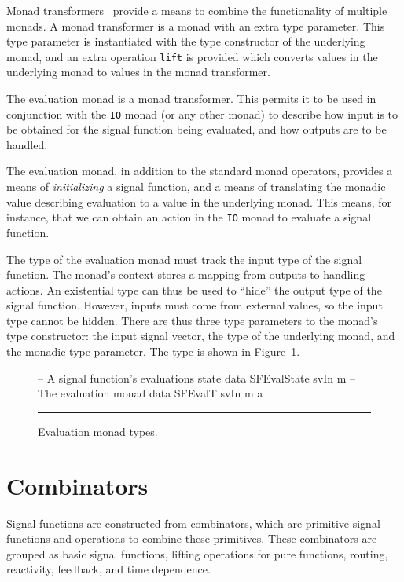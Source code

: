 Monad transformers~\cite{Jones1995} provide a means to combine the functionality
of multiple monads. A monad transformer is a monad with an extra type parameter.
This type parameter is instantiated with the type constructor of the underlying
monad, and an extra operation {\tt lift} is provided which converts values in
the underlying monad to values in the monad transformer.

The evaluation monad is a monad transformer. This permits it to be used in
conjunction with the {\tt IO} monad (or any other monad) to describe how input
is to be obtained for the signal function being evaluated, and how outputs are
to be handled.

The evaluation monad, in addition to the standard monad operators, provides a
means of {\em initializing} a signal function, and a means of translating the
monadic value describing evaluation to a value in the underlying monad. This
means, for instance, that we can obtain an action in the {\tt IO} monad to
evaluate a signal function.

The type of the evaluation monad must track the input type of the signal
function. The monad's context stores a mapping from outputs to handling actions.
An existential type can thus be used to ``hide'' the output type of the signal
function. However, inputs must come from external values, so the input type
cannot be hidden. There are thus three type parameters to the monad's type
constructor: the input signal vector, the type of the underlying monad, and the
monadic type parameter. The type is shown in Figure~\ref{figure:evaluation_monad_types}.

\begin{figure}
\begin{code}
-- A signal function's evaluations state
data SFEvalState svIn m
-- The evaluation monad
data SFEvalT svIn m a
\end{code}
\hrule
\caption{Evaluation monad types.}
\label{figure:evaluation_monad_types}
\end{figure}

\section{Combinators}
\label{section:System_Design_and_Interface-Combinators}

Signal functions are constructed from combinators, which are primitive signal
functions and operations to combine these primitives. These combinators are
grouped as basic signal functions, lifting operations for pure functions,
routing, reactivity, feedback, and time dependence.

